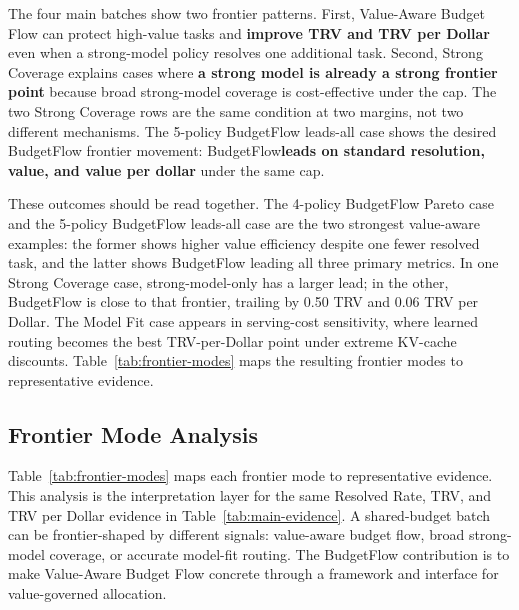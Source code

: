 \documentclass{article}
\newcommand{\method}{BudgetFlow\xspace}
\newcommand{\trv}{TRV\xspace}
\begin{document}
The four main batches show two frontier patterns. First, Value-Aware Budget Flow can protect high-value tasks and \textbf{improve \trv and \trv per Dollar} even when a strong-model policy resolves one additional task. Second, Strong Coverage explains cases where \textbf{a strong model is already a strong frontier point} because broad strong-model coverage is cost-effective under the cap. The two Strong Coverage rows are the same condition at two margins, not two different mechanisms. The 5-policy BudgetFlow leads-all case shows the desired \method frontier movement: \method \textbf{leads on standard resolution, value, and value per dollar} under the same cap.

These outcomes should be read together. The 4-policy BudgetFlow Pareto case and the 5-policy BudgetFlow leads-all case are the two strongest value-aware examples: the former shows higher value efficiency despite one fewer resolved task, and the latter shows \method leading all three primary metrics. In one Strong Coverage case, strong-model-only has a larger lead; in the other, \method is close to that frontier, trailing by 0.50 \trv and 0.06 \trv per Dollar. The Model Fit case appears in serving-cost sensitivity, where learned routing becomes the best \trv-per-Dollar point under extreme KV-cache discounts. Table~\ref{tab:frontier-modes} maps the resulting frontier modes to representative evidence.

\subsection{Frontier Mode Analysis}
Table~\ref{tab:frontier-modes} maps each frontier mode to representative evidence. This analysis is the interpretation layer for the same Resolved Rate, \trv, and \trv per Dollar evidence in Table~\ref{tab:main-evidence}. A shared-budget batch can be frontier-shaped by different signals: value-aware budget flow, broad strong-model coverage, or accurate model-fit routing. The \method contribution is to make Value-Aware Budget Flow concrete through a framework and interface for value-governed allocation.
\end{document}
